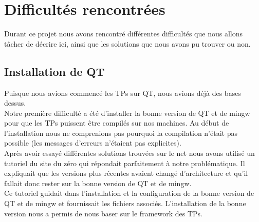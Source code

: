\documentclass[10pt,a4paper,titlepage]{article}
\begin{document}
\section{Difficultés rencontrées}
Durant ce projet nous avons rencontré différentes difficultés que nous allons tâcher de décrire ici, ainsi que les solutions que nous avons pu trouver ou non.
\subsection{Installation de QT}
Puisque nous avions commencé les TPs sur QT, nous avions déjà des bases dessus.\\

Notre première difficulté a été d'installer la bonne version de QT et de mingw pour que les TPs puissent être compilés sur nos machines.
Au début de l'installation nous ne comprenions pas pourquoi la compilation n'était pas possible (les messages d'erreurs n'étaient pas explicites).\\

Après avoir essayé différentes solutions trouvées sur le net nous avons utilisé un tutoriel du site du zéro qui répondait parfaitement à notre problématique. Il expliquait que les versions plus récentes avaient changé d'architecture et qu'il fallait donc rester sur la bonne version de QT et de mingw.\\
Ce tutoriel guidait dans l'installation et la configuration de la bonne version de QT et de mingw et fournissait les fichiers associés. L'installation de la bonne version nous a permis de nous baser sur le framework des TPs.
\end{document}
